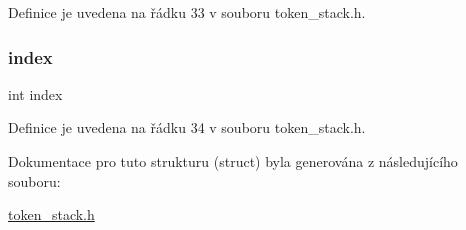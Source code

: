 Definice je uvedena na řádku 33 v souboru token\+\_\+stack.\+h.

\mbox{\label{struct_s___token_stack_a750b5d744c39a06bfb13e6eb010e35d0}} 
\subsubsection{\texorpdfstring{index}{index}}
{\footnotesize\ttfamily int index}



Definice je uvedena na řádku 34 v souboru token\+\_\+stack.\+h.



Dokumentace pro tuto strukturu (struct) byla generována z následujícího souboru\+:\begin{DoxyCompactItemize}
\item 
\hyperlink{token__stack_8h}{token\+\_\+stack.\+h}\end{DoxyCompactItemize}
